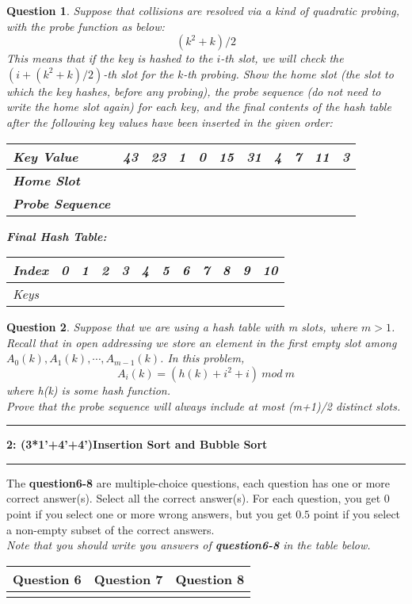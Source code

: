 \documentclass[10.5pt]{article}
\newcommand\question[2]{\vspace{.25in}\hrule\textbf{#1: #2}\vspace{.5em}\hrule\vspace{.10in}}
\newtheorem{Q}{Question}
\begin{document}
\begin{Q}
Suppose that collisions are resolved via a kind of quadratic probing, with the probe function as below:
$$(k^2+k)/2$$
This means that if the key is hashed to the $i$-th slot, we will check the $(i+(k^2+k)/2)$-th slot for the $k$-th probing. Show the home slot (the slot to which the key hashes, before any probing), the probe sequence (do not need to write the home slot again) for each key, and the final contents of the hash table after the following key values have been inserted in the given order: 
\begin{table}[ht]
\begin{tabular}{|p{1.7cm}|p{1cm}|p{1cm}|p{1cm}|p{1cm}|p{1cm}|p{1cm}|p{1cm}|p{1cm}|p{1cm}|p{1cm}|}
\hline
\textbf{Key Value}& 43&23&1&0&15&31&4&7&11&3 \\ \hline
\textbf{Home Slot}& &&&&&&&&&     \\ \hline
\textbf{Probe Sequence}& &&&&&&&&&    \\ \hline
\end{tabular}
\end{table}

\textbf{Final Hash Table:}
\begin{table}[ht]
\begin{tabular}{|l|p{1cm}|p{1cm}|p{1cm}|p{1cm}|p{1cm}|p{1cm}|p{1cm}|p{1cm}|p{1cm}|p{1cm}|p{1cm}|}
\hline
Index & 0&1&2&3&4&5&6&7&8&9&10 \\ \hline
Keys     &&&&&&&&&&&     \\ \hline
\end{tabular}
\end{table}
\end{Q}

\begin{Q}
Suppose that we are using a hash table with m slots, where $m>1$. Recall that in open addressing we store an element in the first empty slot among $A_0(k),A_1(k),\cdots,A_{m-1}(k)$. In this problem,
$$A_i(k)=(h(k)+i^2+i)~mod~m$$
where h(k) is some hash function.\\
Prove that the probe sequence will always include at most (m+1)/2 distinct slots.
\end{Q}

\pagebreak
\question{2}{(3*1'+4'+4')Insertion Sort and Bubble Sort}


The \textbf{question6-8} are multiple-choice questions, each question has one or more correct answer(s). Select all the correct answer(s). For each question, you get $0$ point if you select one or more wrong answers, but you get $0.5$ point if you select a non-empty subset of the correct answers.\\
\textit{Note that you should write you answers of \textbf{question6-8} in the table below.}
\begin{table}[htbp]
	\begin{tabular}{|p{2cm}|p{2cm}|p{2cm}|}
		\hline 
		Question 6 & Question 7 & Question 8\\
		\hline 
		& & \\ 
		\hline 
	\end{tabular} 
\end{table}
\end{document}
